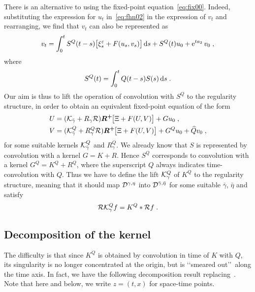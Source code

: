 \documentclass[reqno,11pt]{article}
\def\Rplus{\boldsymbol{R^+}\hspace{-.1em}}
\begin{document}
There is an alternative to using the fixed-point equation~\eqref{eq:fix00}. 
Indeed, substituting the expression for $u_t$ in~\eqref{eq:fhn02} in the
expression of $v_t$ and rearranging, we find that $v_t$ can also be represented
as
\begin{equation}
 v_t = \int_0^t S^Q(t-s) \bigl[\xi^\varepsilon_s + F(u_s,v_s)\bigr] \operatorname{d}\!s 
 + S^Q(t) u_0  + \operatorname{e}^{ta_2}v_0\;, 
\end{equation} 
where 
\begin{equation}
 S^Q(t) = \int_0^t Q(t-s)S(s)\operatorname{d}\!s\;.
\end{equation} 
Our aim is thus to lift the operation of convolution with $S^Q$ to the
regularity structure, in order to obtain an equivalent fixed-point equation 
of the form 
\begin{align}
\nonumber
U &= (\cK_{\bar\gamma}+R_\gamma\cR)\Rplus \bigbrak{\Xi+F(U,V)} + Gu_0\;, \\
V &= (\cK^Q_{\bar\gamma}+R^Q_\gamma\cR)\Rplus \bigbrak{\Xi+F(U,V)} 
+ G^Qu_0 + \widehat Qv_0\;, 
\label{eq:fix01}
\end{align}
for some suitable kernels ${\mathcal K}^Q_{\bar\gamma}$ and $R^Q_\gamma$. We already know
that $S$ is represented by convolution with a kernel $G=K+R$. Hence $S^Q$
corresponds to convolution with a kernel $G^Q=K^Q+R^Q$, where the superscript
$Q$ always indicates time-convolution with $Q$. Thus we have to define the lift
${\mathcal K}^Q_\gamma$ of $K^Q$ to the regularity structure, meaning that it should map
${\mathcal D}^{\gamma,\eta}$ into ${\mathcal D}^{\bar\gamma,\bar\eta}$ for some suitable
$\bar\gamma$, $\bar\eta$ and satisfy
\begin{equation}
 {\mathcal R}{\mathcal K}^Q_\gamma f = K^Q * {\mathcal R} f\;.
\end{equation} 


\subsection{Decomposition of the kernel}

The difficulty is that since $K^Q$ is obtained by convolution in time of $K$
with $Q$, its singularity is no longer concentrated at the origin, but is
\lq\lq smeared out\rq\rq\ along the time axis. In fact, we have the following
decomposition result replacing~\cite[Assumption~5.1]{Hairer2014}. 
Note that here and below, we write $z=(t,x)$ for space-time 
points.
\end{document}
